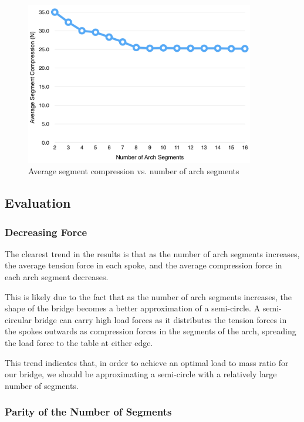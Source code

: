 \documentclass[a4paper,11pt]{article}
\begin{document}
\begin{figure}
\begin{center}
\includegraphics[width=10cm]{figures/segments.png}
\end{center}
\caption{Average segment compression vs. number of arch segments}
\end{figure}


\subsection{Evaluation}

\subsubsection{Decreasing Force}

The clearest trend in the results is that as the number of arch segments
increases, the average tension force in each spoke, and the average compression
force in each arch segment decreases.

This is likely due to the fact that as the number of arch segments increases,
the shape of the bridge becomes a better approximation of a semi-circle.
A semi-circular bridge can carry high load forces as it distributes the tension
forces in the spokes outwards as compression forces in the segments of the arch,
spreading the load force to the table at either edge.

This trend indicates that, in order to achieve an optimal load to mass ratio for
our bridge, we should be approximating a semi-circle with a relatively large
number of segments.


\subsubsection{Parity of the Number of Segments}
\end{document}

